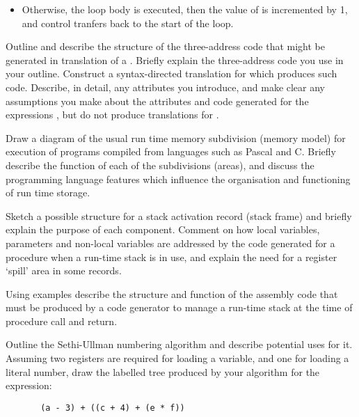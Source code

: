 \begin{questions}
\begin{subquestions}
\begin{itemize}
\item Otherwise, the loop body  is
        executed,  
        then the value of  is incremented by 1,
        and control tranfers back to the start of the loop.
\end{itemize}
\begin{subsubquestions}
\subsubquestion
	Outline and describe the structure of the three-address
        code that might be generated in translation of
        a .  
        Briefly explain the
	three-address code you use in your outline.
\subsubquestion
        Construct a syntax-directed translation for 
         which produces such code.
        Describe, in detail, any attributes you
        introduce, and make clear any assumptions you make about 
        the attributes and code generated for the
        expressions , but do not produce translations for
	.
\end{subsubquestions}
\end{subquestions}

\question

\begin{subquestions}
\subquestion
Draw a diagram of the usual run time memory
subdivision (memory model) for execution of
programs compiled from languages such as
Pascal and C.  Briefly describe the function of each
of the subdivisions (areas), and discuss
the programming language features which influence
the organisation and functioning of run time storage.

\subquestion
Sketch a possible structure for a stack activation
record (stack frame) and briefly explain the purpose of
each component. Comment on how local variables,
parameters and non-local variables
are addressed by the code generated for a
procedure when a run-time stack is in use,
and explain the need for a register `spill' area
in some records.

\subquestion

Using examples describe the structure and function of the
assembly code
that must be produced by a code generator to manage a run-time
stack at the time of procedure call and return.

\end{subquestions}


 
\question

\begin{subquestions}

\subquestion
Outline the Sethi-Ullman numbering algorithm and 
describe potential uses for it.  Assuming two registers
are required for loading a variable, and one for loading a literal number, 
draw the labelled
tree produced by your algorithm for the expression:
\begin{verbatim}
       (a - 3) + ((c + 4) + (e * f))
\end{verbatim}


\end{subquestions}
\end{questions}
